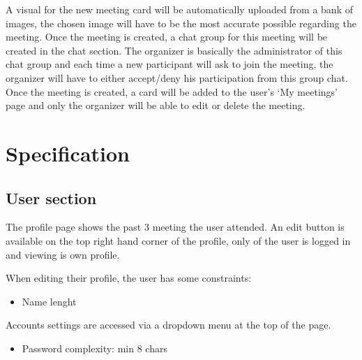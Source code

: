 \documentclass[conference]{IEEEtran}
\begin{document}
A visual for the new meeting card will be automatically uploaded from a bank of images, the chosen image will have to be the most accurate possible regarding the meeting.
Once the meeting is created, a chat group for this meeting will be created in the chat section. The organizer is basically the administrator of this chat group and each time a new participant will ask to join the meeting, the organizer will
have to either accept/deny his participation from this group chat.
Once the meeting is created, a card will be added to the user’s ‘My meetings’ page and only the organizer will be able to edit or delete the meeting.

\section{Specification}

\subsection{User section}

The profile page shows the past 3 meeting the user attended. An edit button is available on the top right hand corner of the profile, only of the user is logged in and viewing is own profile.

When editing their profile, the user has some constraints:

\begin{itemize}
    \item Name lenght
\end{itemize}

Accounts settings are accessed via a dropdown menu at the top of the page.

\begin{itemize}
    \item Password complexity: min 8 chars
\end{itemize}
\end{document}
